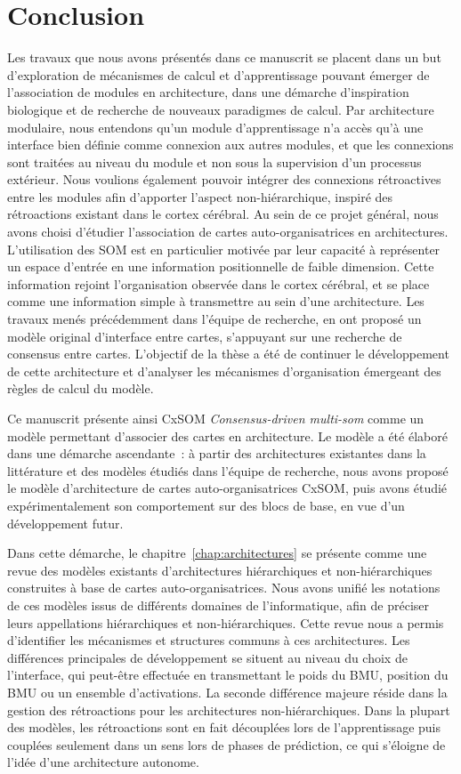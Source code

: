 \chapter*{Conclusion}

Les travaux que nous avons présentés dans ce manuscrit se placent dans un but d'exploration de mécanismes de calcul et d'apprentissage pouvant émerger de l'association de modules en architecture, dans une démarche d'inspiration biologique et de recherche de nouveaux paradigmes de calcul. 
Par architecture modulaire, nous entendons qu'un module d'apprentissage n'a accès qu'à une interface bien définie comme connexion aux autres modules, et que les connexions sont traitées au niveau du module et non sous la supervision d'un processus extérieur. Nous voulions également pouvoir intégrer des connexions rétroactives entre les modules afin d'apporter l'aspect non-hiérarchique, inspiré des rétroactions existant dans le cortex cérébral. 
Au sein de ce projet général, nous avons choisi d'étudier l'association de cartes auto-organisatrices en architectures. L'utilisation des SOM est en particulier motivée par leur capacité à représenter un espace d'entrée en une information positionnelle de faible dimension. Cette information rejoint l'organisation observée dans le cortex cérébral, et se place comme une information simple à transmettre au sein d'une architecture.
Les travaux menés précédemment dans l'équipe de recherche, en \cite{menard05,khouzam_2013,baheux_towards_2014} ont proposé un modèle original d'interface entre cartes, s'appuyant sur une recherche de consensus entre cartes. 
L'objectif de la thèse a été de continuer le développement de cette architecture et d'analyser les mécanismes d'organisation émergeant des règles de calcul du modèle. 


Ce manuscrit présente ainsi CxSOM \emph{Consensus-driven multi-som} comme un modèle permettant d'associer des cartes en architecture. Le modèle a été élaboré dans une démarche ascendante~: à partir des architectures existantes dans la littérature et des modèles étudiés dans l'équipe de recherche, nous avons proposé le modèle d'architecture de cartes auto-organisatrices CxSOM, puis avons étudié expérimentalement son comportement sur des blocs de base, en vue d'un développement futur.

Dans cette démarche, le chapitre~\ref{chap:architectures} se présente comme une revue des modèles existants d'architectures hiérarchiques et non-hiérarchiques construites à base de cartes auto-organisatrices. 
Nous avons unifié les notations de ces modèles issus de différents domaines de l'informatique, afin de préciser leurs appellations hiérarchiques et non-hiérarchiques.
Cette revue nous a permis d'identifier les mécanismes et structures communs à ces architectures. Les différences principales de développement se situent au niveau du choix de l'interface, qui peut-être effectuée en transmettant le poids du BMU, position du BMU ou un ensemble d'activations. 
La seconde différence majeure réside dans la gestion des rétroactions pour les architectures non-hiérarchiques.  Dans la plupart des modèles, les rétroactions sont en fait découplées lors de l'apprentissage puis couplées seulement dans un sens lors de phases de prédiction, ce qui s'éloigne de l'idée d'une architecture autonome.

